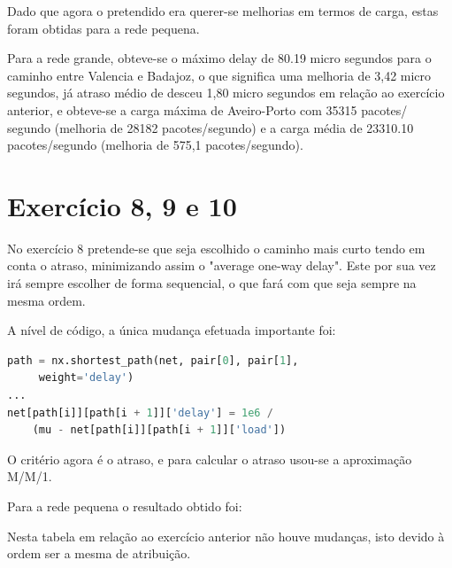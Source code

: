 \documentclass[pdftex,12pt,a4paper]{report}
\begin{document}
Dado que agora o pretendido era querer-se melhorias em termos de carga, estas foram obtidas para a rede pequena.

\newpage

Para a rede grande, obteve-se o máximo delay de 80.19 micro segundos para o caminho entre Valencia e Badajoz, o que significa uma melhoria de 3,42 micro segundos, já atraso médio de desceu 1,80 micro segundos em relação ao exercício anterior, e obteve-se a carga máxima de Aveiro-Porto com 35315 pacotes/ segundo (melhoria de 28182 pacotes/segundo)  e a carga média de 23310.10 pacotes/segundo (melhoria de 575,1 pacotes/segundo).






\section{Exercício 8, 9 e 10}

No exercício 8 pretende-se que seja escolhido o caminho mais curto tendo em conta o atraso, minimizando assim o "average one-way delay". Este por sua vez irá sempre escolher de forma sequencial, o que fará com que seja sempre na mesma ordem.

A nível de código, a única mudança efetuada importante foi:
\begin{lstlisting}[language=python]
path = nx.shortest_path(net, pair[0], pair[1],
	 weight='delay')
...
net[path[i]][path[i + 1]]['delay'] = 1e6 / 
	(mu - net[path[i]][path[i + 1]]['load'])
\end{lstlisting}

O critério agora é o atraso, e para calcular o atraso usou-se a aproximação M/M/1.

\newpage

Para a rede pequena o resultado obtido foi:



Nesta tabela em relação ao exercício anterior não houve mudanças, isto devido à ordem ser a mesma de atribuição.


\end{document}
